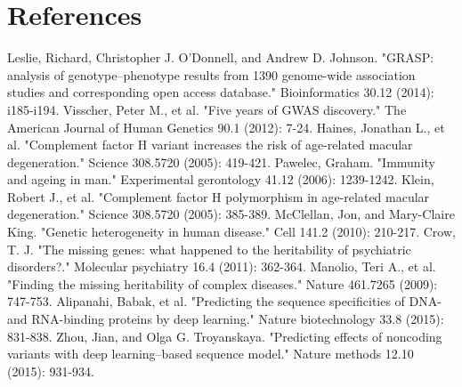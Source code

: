 \documentclass{article}
\begin{document}
\clearpage
\section{References}

\begin{thebibliography}{10}
Leslie, Richard, Christopher J. O’Donnell, and Andrew D. Johnson. "GRASP: analysis of genotype–phenotype results from 1390 genome-wide association studies and corresponding open access database." Bioinformatics 30.12 (2014): i185-i194.
Visscher, Peter M., et al. "Five years of GWAS discovery." The American Journal of Human Genetics 90.1 (2012): 7-24.
Haines, Jonathan L., et al. "Complement factor H variant increases the risk of age-related macular degeneration." Science 308.5720 (2005): 419-421.
Pawelec, Graham. "Immunity and ageing in man." Experimental gerontology 41.12 (2006): 1239-1242.
Klein, Robert J., et al. "Complement factor H polymorphism in age-related macular degeneration." Science 308.5720 (2005): 385-389.
McClellan, Jon, and Mary-Claire King. "Genetic heterogeneity in human disease." Cell 141.2 (2010): 210-217.
Crow, T. J. "The missing genes: what happened to the heritability of psychiatric disorders?." Molecular psychiatry 16.4 (2011): 362-364.
Manolio, Teri A., et al. "Finding the missing heritability of complex diseases." Nature 461.7265 (2009): 747-753.
Alipanahi, Babak, et al. "Predicting the sequence specificities of DNA-and RNA-binding proteins by deep learning." Nature biotechnology 33.8 (2015): 831-838.
Zhou, Jian, and Olga G. Troyanskaya. "Predicting effects of noncoding variants with deep learning–based sequence model." Nature methods 12.10 (2015): 931-934.
\end{thebibliography}

\clearpage
\newpage 
\end{document}
